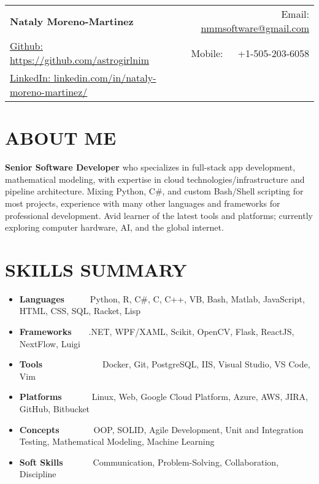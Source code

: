 \documentclass[a4paper,20pt]{article}
\newcommand{\resumeItem}[2]{
  \item\small{
    \textbf{#1}{#2 \vspace{-3pt}}
  }
}
\newcommand{\resumeSubItem}[2]{\resumeItem{#1}{#2}\vspace{-5pt}}
\newcommand{\resumeSubHeadingListStart}{\begin{itemize}[leftmargin=*]}
\newcommand{\resumeSubHeadingListEnd}{\end{itemize}}
\begin{document}
\begin{tabular*}{\textwidth}{l@{\extracolsep{\fill}}r}
  \textbf{{\LARGE Nataly Moreno-Martinez}} & Email: \href{mailto:}{nmmsoftware@gmail.com}\\
  \href{https://github.com/astrogirlnim}{Github: https://github.com/astrogirlnim} & Mobile:~~~+1-505-203-6058 \\
  \href{https://www.linkedin.com/in/nataly-moreno-martinez/}{LinkedIn: linkedin.com/in/nataly-moreno-martinez/} \\
\end{tabular*}

\vspace{2pt}
\section{\textbf{ABOUT ME}}
\textbf{Senior Software Developer} who specializes in full-stack app development, mathematical modeling, with expertise in cloud technologies/infrastructure and pipeline architecture. Mixing Python, C\#, and custom Bash/Shell scripting for most projects, experience with many other languages and frameworks for professional development. Avid learner of the latest tools and platforms; currently exploring computer hardware, AI, and the global internet.
\vspace{6pt}
\section{\textbf{SKILLS SUMMARY}}
	\resumeSubHeadingListStart
	\resumeSubItem{Languages}{~~~~~~Python, R, C\#, C, C++, VB, Bash, Matlab, JavaScript, HTML, CSS, SQL, Racket, Lisp}
	\resumeSubItem{Frameworks}{~~~~.NET, WPF/XAML, Scikit, OpenCV, Flask, ReactJS, NextFlow, Luigi}
	\resumeSubItem{Tools}{~~~~~~~~~~~~~~Docker, Git, PostgreSQL, IIS, Visual Studio, VS Code, Vim}
	\resumeSubItem{Platforms}{~~~~~~~Linux, Web, Google Cloud Platform, Azure, AWS, JIRA,  GitHub, Bitbucket}
    \resumeSubItem{Concepts}{~~~~~~~~OOP, SOLID, Agile Development, Unit and Integration Testing, Mathematical Modeling, Machine Learning}
	\resumeSubItem{Soft Skills}{~~~~~~~Communication, Problem-Solving, Collaboration, Discipline}

\resumeSubHeadingListEnd
\vspace{6pt}
\end{document}
